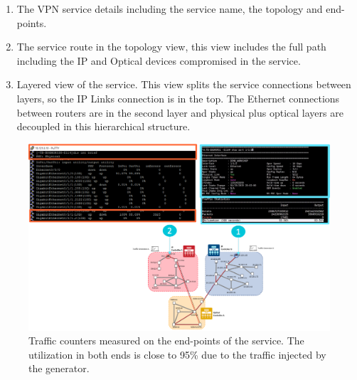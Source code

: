 \documentclass[10pt, conference]{IEEEtran}
\begin{document}
\begin{enumerate}
    \item The VPN service details including the service name, the topology and end-points. 
    \item The service route in the topology view, this view includes the full path including the IP and Optical devices compromised in the service.
    \item Layered view of the service. This view splits the service connections between layers, so the IP Links connection is in the top. The Ethernet connections between routers are in the second layer and physical plus optical layers are decoupled in this hierarchical structure.
\end{enumerate}

\begin{figure}
	\centering
		\includegraphics[width=\linewidth]{figs/counters.png}
	\caption{Traffic counters measured on the end-points of the service. The utilization in both ends is close to 95\% due to the traffic injected by the generator.}
	\label{FIG:counters}
\end{figure}
\end{document}
